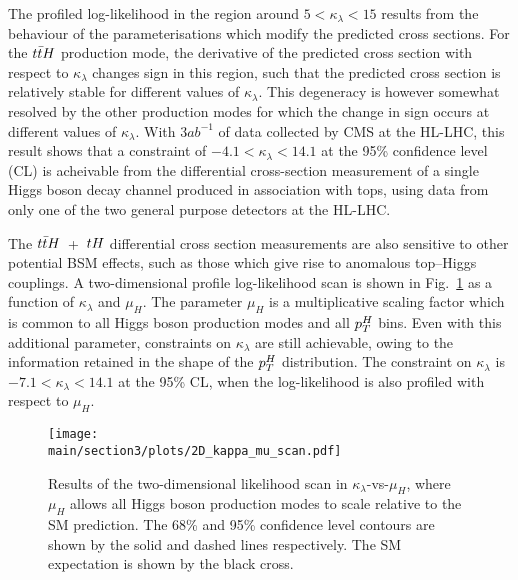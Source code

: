 The profiled log-likelihood in the region around 
$5<\kappa_\lambda<15$ results from the behaviour of the parameterisations which modify the predicted cross sections. For the $t\bar{t}H$ production mode, the derivative of the predicted cross section with respect to $\kappa_\lambda$ changes sign in this region, such that the predicted cross section is relatively stable for different values of $\kappa_\lambda$. This degeneracy is however somewhat resolved by the  other production modes for which the change in sign occurs at different values of $\kappa_\lambda$. With $3ab^{-1}$ of data collected by CMS at the HL-LHC, this result shows that a constraint of $-4.1 < \kappa_\lambda < 14.1$ at the 95\% confidence level (CL) is acheivable from the differential cross-section measurement of a single Higgs boson decay channel produced in association with tops, using data from only one of the two general purpose detectors at the HL-LHC.  


The $t\bar{t}H$~+~$tH$ differential cross section measurements are also sensitive to other potential BSM effects, such as those which give rise to anomalous top--Higgs couplings. A two-dimensional profile log-likelihood scan is shown in  Fig.~\ref{fig:ttHdiff_CMS_klambda_2Dscan} as a function of $\kappa_\lambda$ and $\mu_{H}$. The parameter $\mu_{H}$ is a multiplicative scaling factor which is common to all Higgs boson production modes and all $p_{T}^{H}$ bins. Even with this additional parameter, constraints on $\kappa_\lambda$ are still achievable, owing to the information retained in the shape of the $p_{T}^{H}$ distribution. The constraint on $\kappa_\lambda$ is $-7.1 < \kappa_\lambda < 14.1$ at the 95\% CL, when the log-likelihood is also profiled with respect to $\mu_{H}$. 

\begin{figure}[htb!]
        \centering
        \texttt{[image: \\main/section3/plots/2D\_kappa\_mu\_scan.pdf]}
        \caption{Results of the two-dimensional likelihood scan in $\kappa_\lambda$-vs-$\mu_{H}$, where $\mu_{H}$ allows all Higgs boson production modes to scale relative to the SM prediction. The 68\% and 95\% confidence level contours are shown by the solid and dashed lines respectively. The SM expectation is shown by the black cross.}
        \label{fig:ttHdiff_CMS_klambda_2Dscan}
\end{figure}


